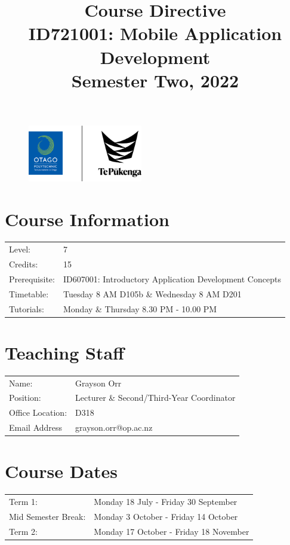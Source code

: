\documentclass{article}
\author{}
\begin{document}
\begin{figure}
	\includegraphics[width=50mm]{../img/logo.png}
\end{figure}

\title{Course Directive\\ID721001: Mobile Application Development\\Semester Two, 2022}
\date{}
\maketitle

\section*{Course Information}
\begin{tabular}{ll}
	Level:        & 7 \\
	Credits:      & 15                                              \\
	Prerequisite: & ID607001: Introductory Application Development Concepts \\
	Timetable:    & Tuesday 8 AM D105b \& Wednesday 8 AM D201\\
	Tutorials:          & Monday \& Thursday 8.30 PM - 10.00 PM
\end{tabular}

\section*{Teaching Staff}
\begin{tabular}{ll}
	Name:            & Grayson Orr                           \\
	Position:        & Lecturer \& Second/Third-Year Coordinator \\
	Office Location: & D318                                 \\
	Email Address    & grayson.orr@op.ac.nz                    \\
\end{tabular}

\section*{Course Dates}
\begin{tabular}{ll}
	Term 1:             &  Monday 18 July - Friday 30 September \\
	Mid Semester Break: &  Monday 3 October - Friday 14 October     \\
	Term 2:             &  Monday 17 October - Friday 18 November      \\
\end{tabular}
\end{document}
